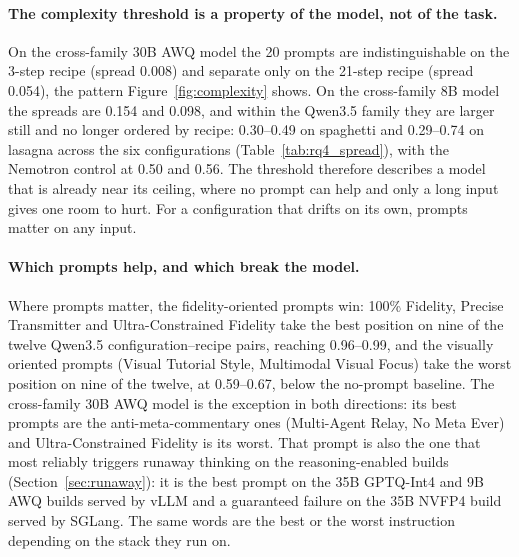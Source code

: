 \documentclass[11pt]{article}
\begin{document}




\paragraph{The complexity threshold is a property of the model, not of the
task.}
On the cross-family 30B AWQ model the 20 prompts are indistinguishable on the
3-step recipe (spread 0.008) and separate only on the 21-step recipe (spread
0.054), the pattern Figure~\ref{fig:complexity} shows. On the cross-family
8B model the spreads are 0.154 and 0.098, and within the Qwen3.5 family they
are larger still and no longer ordered by recipe: 0.30--0.49 on spaghetti and
0.29--0.74 on lasagna across the six configurations
(Table~\ref{tab:rq4_spread}), with the Nemotron control at 0.50 and 0.56.
The threshold therefore describes a model that is already near its ceiling,
where no prompt can help and only a long input gives one room to hurt. For a
configuration that drifts on its own, prompts matter on any input.

\paragraph{Which prompts help, and which break the model.}
Where prompts matter, the fidelity-oriented prompts win: 100\% Fidelity,
Precise Transmitter and Ultra-Constrained Fidelity take the best position on
nine of the twelve Qwen3.5 configuration--recipe pairs, reaching
0.96--0.99, and the visually oriented prompts (Visual Tutorial Style,
Multimodal Visual Focus) take the worst position on nine of the twelve, at 0.59--0.67,
below the no-prompt baseline. The cross-family 30B AWQ model is the
exception in both directions: its best prompts are the anti-meta-commentary
ones (Multi-Agent Relay, No Meta Ever) and Ultra-Constrained Fidelity is its
worst. That prompt is also the one that most reliably triggers runaway
thinking on the reasoning-enabled builds (Section~\ref{sec:runaway}): it is
the best prompt on the 35B GPTQ-Int4 and 9B AWQ builds served by vLLM and a
guaranteed failure on the 35B NVFP4 build served by SGLang. The same words
are the best or the worst instruction depending on the stack they run on.
\end{document}
